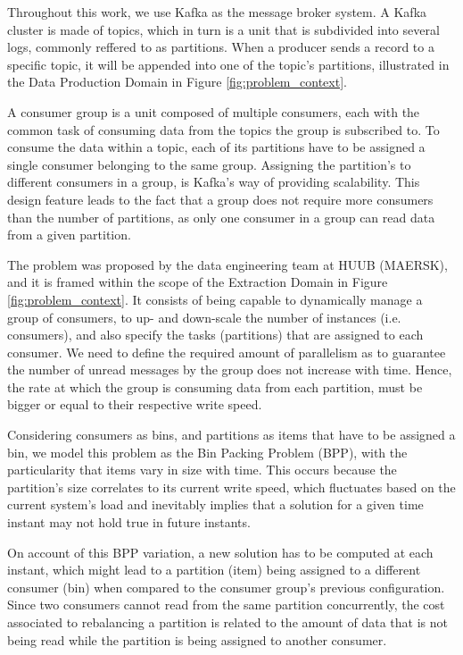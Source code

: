 Throughout this work, we use Kafka as the message broker system. A Kafka cluster
is made of topics, which in turn is a unit that is subdivided into several logs,
commonly reffered to as partitions. When a producer sends a record to a specific
topic, it will be appended into one of the topic's partitions, illustrated in
the Data Production Domain in Figure \ref{fig:problem_context}. 

A consumer group is a unit composed of multiple consumers, each with the common
task of consuming data from the topics the group is subscribed to. To consume
the data within a topic, each of its partitions have to be assigned a single
consumer belonging to the same group. Assigning the partition's to different
consumers in a group, is Kafka's way of providing scalability. This design
feature leads to the fact that a group does not require more consumers than the
number of partitions, as only one consumer in a group can read data from a given
partition.

The problem was proposed by the data engineering team at HUUB (MAERSK), and it
is framed within the scope of the Extraction Domain in Figure
\ref{fig:problem_context}. It consists of being capable to dynamically manage a
group of consumers, to up- and down-scale the number of instances (i.e.
consumers), and also specify the tasks (partitions) that are assigned to each
consumer. We need to define the required amount of parallelism as to guarantee the
number of unread messages by the group does not increase with time. Hence, the
rate at which the group is consuming data from each partition, must be bigger or
equal to their respective write speed.

Considering consumers as bins, and partitions as items that have to be assigned
a bin, we model this problem as the Bin Packing Problem (BPP), with the
particularity that items vary in size with time. This occurs because the
partition's size correlates to its current write speed, which fluctuates based
on the current system's load and inevitably implies that a solution for a given
time instant may not hold true in future instants. 

On account of this BPP variation, a new solution has to be computed at each
instant, which might lead to a partition (item) being assigned to a different
consumer (bin) when compared to the consumer group's previous configuration.
Since two consumers cannot read from the same partition concurrently, the cost
associated to rebalancing a partition is related to the amount of data that is
not being read while the partition is being assigned to another consumer. 

